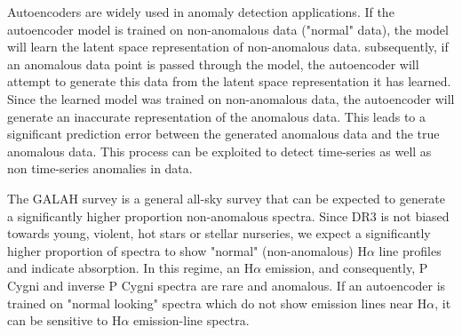 Autoencoders are widely used in anomaly detection applications\cite{sakurada2014anomaly}. If the autoencoder model is trained on non-anomalous data ("normal" data), the model will learn the latent space representation of non-anomalous data. subsequently, if an anomalous data point is passed through the model, the autoencoder will attempt to generate this data from the latent space representation it has learned. Since the learned model was trained on non-anomalous data, the autoencoder will generate an inaccurate representation of the anomalous data. This leads to a significant prediction error between the generated anomalous data and the true anomalous data. This process can be exploited to detect time-series as well as non time-series anomalies in data.

The GALAH survey is a general all-sky survey that can be expected to generate a significantly higher proportion non-anomalous spectra. Since DR3 is not biased towards young, violent, hot stars or stellar nurseries, we expect a significantly higher proportion of spectra to show "normal" (non-anomalous) H$\alpha$ line profiles and indicate absorption. In this regime, an H$\alpha$ emission, and consequently, P Cygni and inverse P Cygni spectra are rare and anomalous. If an autoencoder is trained on "normal looking" spectra which do not show emission lines near H$\alpha$, it can be sensitive to H$\alpha$ emission-line spectra. 

